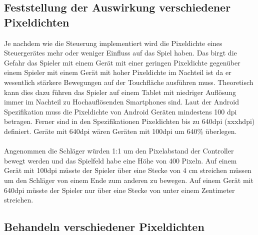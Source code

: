 \subsection{Feststellung der Auswirkung verschiedener Pixeldichten}
Je nachdem wie die Steuerung implementiert wird die Pixeldichte eines Steuergerätes mehr oder weniger Einfluss auf das Spiel haben. Das birgt die Gefahr das Spieler mit einem Gerät mit einer geringen Pixeldichte gegenüber einem Spieler mit einem Gerät mit hoher Pixeldichte im Nachteil ist da er wesentlich stärkere Bewegungen auf der Touchfläche ausführen muss.
Theoretisch kann dies dazu führen das Spieler auf einem Tablet mit niedriger Auflösung immer im Nachteil zu Hochauflösenden Smartphones sind.
Laut der Android Spezifikation muss die Pixeldichte von Android Geräten mindestens 100 dpi betragen. Ferner sind in den Spezifikationen Pixeldichten bis zu 640dpi (xxxhdpi) definiert. Geräte mit 640dpi wären Geräten mit 100dpi um 640\% überlegen.
\paragraph{} Angenommen die Schläger würden 1:1 um den Pixelabstand der Controller bewegt werden und das Spielfeld habe eine Höhe von 400 Pixeln.
Auf einem Gerät mit 100dpi müsste der Spieler über eine Stecke von 4 cm streichen müssen um den Schläger von einem Ende zum anderen zu bewegen. Auf einem Gerät mit 640dpi müsste der Spieler nur über eine Stecke von unter einem Zentimeter streichen.
\subsection{Behandeln verschiedener Pixeldichten}

